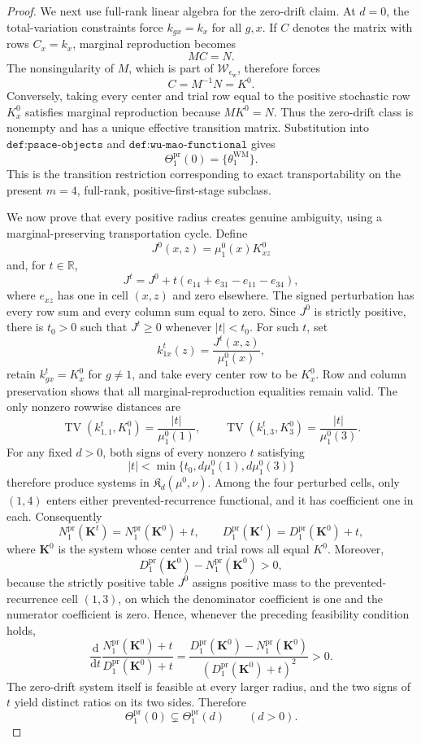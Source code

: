 \documentclass{article}
\begin{document}
\begin{proof}
We next use full-rank linear algebra for the zero-drift claim. At \(d=0\), the total-variation constraints force \(k_{gx}=k_x\) for all \(g,x\). If \(C\) denotes the matrix with rows \(C_x=k_x\), marginal reproduction becomes
\[
 MC=N.
\]
The nonsingularity of \(M\), which is part of \(\mathcal W_{\epsilon_{\mathrm w}}\), therefore forces
\[
 C=M^{-1}N=K^0.
\]
Conversely, taking every center and trial row equal to the positive stochastic row \(K_x^0\) satisfies marginal reproduction because \(MK^0=N\). Thus the zero-drift class is nonempty and has a unique effective transition matrix. Substitution into \(\texttt{def:psace-objects}\) and \(\texttt{def:wu-mao-functional}\) gives
\[
 \Theta_1^{\mathrm{pr}}(0)=\{\theta_1^{\mathrm{WM}}\}.
\]
This is the transition restriction corresponding to exact transportability on the present \(m=4\), full-rank, positive-first-stage subclass.

We now prove that every positive radius creates genuine ambiguity, using a marginal-preserving transportation cycle. Define
\[
 J^0(x,z)=\mu_1^0(x)K^0_{xz}
\]
and, for \(t\in\mathbb R\),
\[
 J^t=J^0+t(e_{14}+e_{31}-e_{11}-e_{34}),
\]
where \(e_{xz}\) has one in cell \((x,z)\) and zero elsewhere. The signed perturbation has every row sum and every column sum equal to zero. Since \(J^0\) is strictly positive, there is \(t_0>0\) such that \(J^t\ge0\) whenever \(|t|<t_0\). For such \(t\), set
\[
 k^t_{1x}(z)=\frac{J^t(x,z)}{\mu_1^0(x)},
\]
retain \(k^t_{gx}=K_x^0\) for \(g\ne1\), and take every center row to be \(K_x^0\). Row and column preservation shows that all marginal-reproduction equalities remain valid. The only nonzero rowwise distances are
\[
 \operatorname{TV}(k^t_{1,1},K_1^0)=\frac{|t|}{\mu_1^0(1)},
 \qquad
 \operatorname{TV}(k^t_{1,3},K_3^0)=\frac{|t|}{\mu_1^0(3)}.
\]
For any fixed \(d>0\), both signs of every nonzero \(t\) satisfying
\[
 |t|<\min\{t_0,d\mu_1^0(1),d\mu_1^0(3)\}
\]
therefore produce systems in \(\mathfrak K_d(\mu^0,\nu)\). Among the four perturbed cells, only \((1,4)\) enters either prevented-recurrence functional, and it has coefficient one in each. Consequently
\[
 N_1^{\mathrm{pr}}(\mathbf K^t)=N_1^{\mathrm{pr}}(\mathbf K^0)+t,
 \qquad
 D_1^{\mathrm{pr}}(\mathbf K^t)=D_1^{\mathrm{pr}}(\mathbf K^0)+t,
\]
where \(\mathbf K^0\) is the system whose center and trial rows all equal \(K^0\). Moreover,
\[
 D_1^{\mathrm{pr}}(\mathbf K^0)-N_1^{\mathrm{pr}}(\mathbf K^0)>0,
\]
because the strictly positive table \(J^0\) assigns positive mass to the prevented-recurrence cell \((1,3)\), on which the denominator coefficient is one and the numerator coefficient is zero. Hence, whenever the preceding feasibility condition holds,
\[
 \frac{\mathrm d}{\mathrm dt}
 \frac{N_1^{\mathrm{pr}}(\mathbf K^0)+t}
      {D_1^{\mathrm{pr}}(\mathbf K^0)+t}
 =\frac{D_1^{\mathrm{pr}}(\mathbf K^0)-N_1^{\mathrm{pr}}(\mathbf K^0)}
 {(D_1^{\mathrm{pr}}(\mathbf K^0)+t)^2}>0.
\]
The zero-drift system itself is feasible at every larger radius, and the two signs of \(t\) yield distinct ratios on its two sides. Therefore
\[
 \Theta_1^{\mathrm{pr}}(0)\subsetneq\Theta_1^{\mathrm{pr}}(d)
 \qquad(d>0).
\]


\end{proof}
\end{document}
